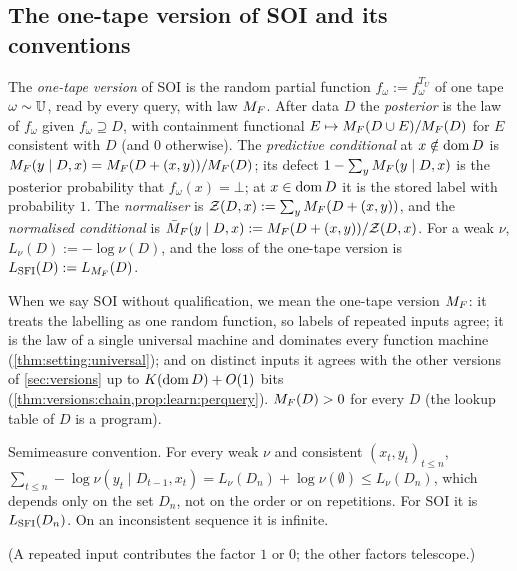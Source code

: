 \subsection{The one-tape version of SOI and its conventions}\label{sec:setting:sfi}

\begin{definition}\label{def:setting:sfi}
The \emph{one-tape version} of SOI is the random partial function $f_\omega:=f^{T_U}_\omega$ of one tape $\omega\sim\mathbb{U}$, read by every query, with law $M_{F}$. After data $D$ the \emph{posterior} is the law of $f_\omega$ given $f_\omega\supseteq D$, with containment functional $E\mapsto M_{F}(D\cup E)/M_{F}(D)$ for $E$ consistent with $D$ (and $0$ otherwise). The \emph{predictive conditional} at $x\notin\operatorname{dom} D$ is $M_{F}(y\mid D,x)=M_{F}(D+(x,y))/M_{F}(D)$; its defect $1-\sum_yM_{F}(y\mid D,x)$ is the posterior probability that $f_\omega(x)=\bot$; at $x\in\operatorname{dom} D$ it is the stored label with probability $1$. The \emph{normaliser} is $\mathcal{Z}(D,x):=\sum_yM_{F}(D+(x,y))$, and the \emph{normalised conditional} is $\bar{M}_{F}(y\mid D,x):=M_{F}(D+(x,y))/\mathcal{Z}(D,x)$. For a weak $\nu$, $L_\nu(D):=-\log\nu(D)$, and the loss of the one-tape version is $L_{\mathrm{SFI}}(D):=L_{M_{F}}(D)$.
\end{definition}

When we say SOI without qualification, we mean the one-tape version $M_{F}$: it treats the labelling as one random function, so labels of repeated inputs agree; it is the law of a single universal machine and dominates every function machine (\cref{thm:setting:universal}); and on distinct inputs it agrees with the other versions of \cref{sec:versions} up to $K(\operatorname{dom} D)+O(1)$ bits (\cref{thm:versions:chain,prop:learn:perquery}). $M_{F}(D)>0$ for every $D$ (the lookup table of $D$ is a program).

\begin{proposition}\label{prop:setting:order}
Semimeasure convention. For every weak $\nu$ and consistent $(x_t,y_t)_{t\le n}$, $\sum_{t\le n}-\log\nu(y_t\mid D_{t-1},x_t)=L_\nu(D_n)+\log\nu(\emptyset)\le L_\nu(D_n)$, which depends only on the set $D_n$, not on the order or on repetitions. For SOI it is $L_{\mathrm{SFI}}(D_n)$. On an inconsistent sequence it is infinite.
\end{proposition}

(A repeated input contributes the factor $1$ or $0$; the other factors telescope.)

